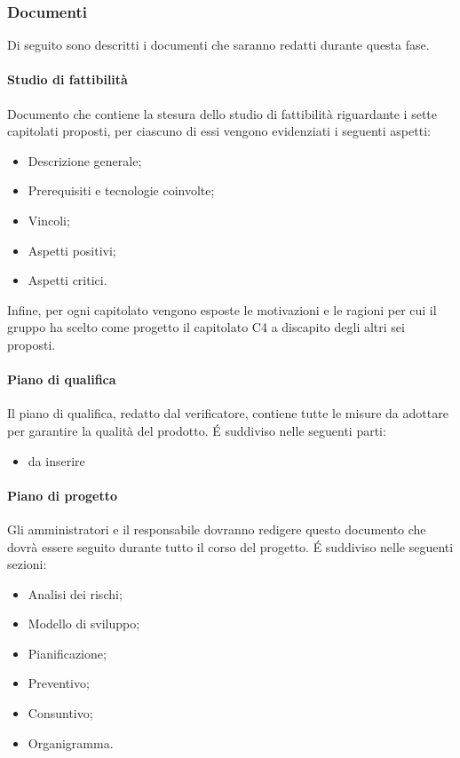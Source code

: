 \subsubsection{Documenti}
Di seguito sono descritti i documenti che saranno redatti durante questa fase.
\paragraph{Studio di fattibilità}
Documento che contiene la stesura dello studio di fattibilità riguardante i sette capitolati proposti, per ciascuno di essi vengono evidenziati i seguenti aspetti:
\begin{itemize}
    \item Descrizione generale;
    \item Prerequisiti e tecnologie coinvolte;
    \item Vincoli;
    \item Aspetti positivi;
    \item Aspetti critici.
\end{itemize}
Infine, per ogni capitolato vengono esposte le motivazioni e le ragioni per cui il gruppo ha scelto come progetto il capitolato C4 \NomeProgetto{} a discapito degli altri sei proposti.\\
\paragraph{Piano di qualifica}
Il piano di qualifica, redatto dal verificatore, contiene tutte le misure da adottare per garantire la qualità del prodotto. \'E suddiviso nelle seguenti parti:
\begin{itemize}
\item da inserire
\end{itemize} 
\paragraph{Piano di progetto}
Gli amministratori e il responsabile dovranno redigere questo documento che dovrà essere seguito durante tutto il corso del progetto. \'E suddiviso nelle seguenti sezioni:
\begin{itemize}
    \item Analisi dei rischi;
    \item Modello di sviluppo;
   \item Pianificazione;  
    \item Preventivo;
    \item Consuntivo;
    \item Organigramma.   
\end{itemize}

